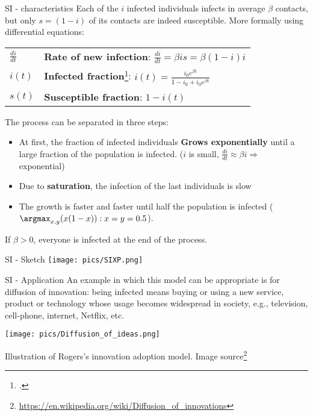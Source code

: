\begin{textbox}{SI - characteristics}
    Each of the $i$ infected individuals infects in average $\beta$ contacts, but only $s=(1-i)$ of its contacts are indeed susceptible. More formally using differential equations:

    \begin{tabular}{p{}|p{}}\scriptsize

        $\frac{di}{dt}$ & \textbf{Rate of new infection}: $\frac{di}{dt}=\beta i s=\beta (1-i)i$                                       \\


        $i(t)$          & \textbf{Infected fraction}\footcite{barrat2008dynamical}: $i(t)=\frac{i_0e^{\beta t}}{1-i_0+i_0e^{\beta t}}$ \\
        $s(t)$          & \textbf{Susceptible fraction}: $1-i(t)$
    \end{tabular}
    The process can be separated in three steps:
    \begin{itemize}
        \item At first, the fraction of infected individuals \textbf{Grows exponentially} until a large fraction of the population is infected. ($i$ is small,  $\frac{di}{dt}\approx \beta i \Rightarrow$ exponential)
        \item Due to \textbf{saturation}, the infection of the last individuals is slow
        \item The growth is faster and faster until half the population is infected ($\argmax_ {x,y}(x(1-x)):x=y=0.5$).
    \end{itemize}



    If $\beta>0$, everyone is infected at the end of the process.
\end{textbox}

\begin{textbox}{SI - Sketch}
    \centering
    \texttt{[image: pics/SIXP.png]}
\end{textbox}

\begin{textbox}{SI - Application}
    An example in which this model can be appropriate is for diffusion of innovation: being infected means buying or using a new service, product or technology whose usage becomes widespread in society, e.g., television, cell-phone, internet, Netflix, etc.

    \centering
    \colorbox{white}{\texttt{[image: pics/Diffusion\_of\_ideas.png]}}

    Illustration of Rogers's innovation adoption model. Image source\footnote{\url{https://en.wikipedia.org/wiki/Diffusion_of_innovations}}
\end{textbox}


